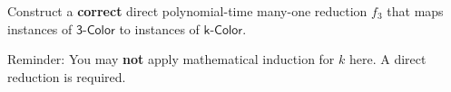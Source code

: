 \begin{parts}
    Construct a \textbf{correct} {\color{blue} direct} {\color{red} polynomial-time many-one reduction} $f_3$ that maps instances of $\mathsf{3 \text{-} Color}$ to instances of $\mathsf{k \text{-} Color}$.
    
    Reminder: You may \textbf{not} apply mathematical induction for $k$ here. A {\color{blue} direct} reduction is required.

    \begin{solution}
    \vspace{2.5in}
    \end{solution}
    
\end{parts}
